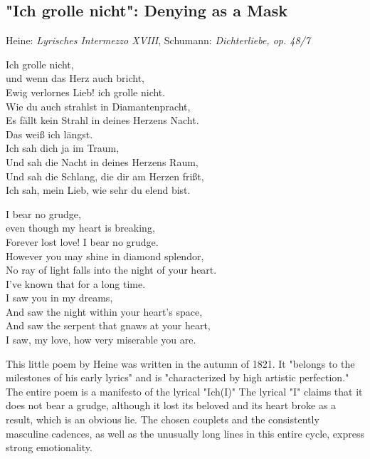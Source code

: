 \documentclass[10pt,a4paper,twocolumn]{rho}
\begin{document}
\subsection{"Ich grolle nicht": Denying as a Mask}
Heine: \textit{Lyrisches Intermezzo XVIII}, Schumann: \textit{Dichterliebe, op. 48/7}
\columnseprule=1pt 
\begin{multicols}{2}

\small {
\noindent Ich grolle nicht, \\
und wenn das Herz auch bricht,\\  
Ewig verlornes Lieb! ich grolle nicht.\\
Wie du auch strahlst in Diamantenpracht,\\
Es fällt kein Strahl in deines Herzens Nacht.\\
Das weiß ich längst.\\
Ich sah dich ja im Traum,\\
Und sah die Nacht in deines Herzens Raum,\\
Und sah die Schlang, die dir am Herzen frißt, \\ 
Ich sah, mein Lieb, wie sehr du elend bist.\\
\columnbreak

\noindent I bear no grudge, \\
even though my heart is breaking, \\ 
Forever lost love! I bear no grudge.  \\
However you may shine in diamond splendor,\\  
No ray of light falls into the night of your heart.  \\
I’ve known that for a long time.\\ 
I saw you in my dreams,\\  
And saw the night within your heart’s space,  \\
And saw the serpent that gnaws at your heart,  \\
I saw, my love, how very miserable you are.}
\end{multicols}
This little poem by Heine was written in the autumn of 1821. It "belongs to the milestones of his early lyrics" and is "characterized by high artistic perfection." The entire poem is a manifesto of the lyrical "Ich(I)" The lyrical "I" claims that it does not bear a grudge, although it lost its beloved and its heart broke as a result, which is an obvious lie. The chosen couplets and the consistently masculine cadences, as well as the unusually long lines in this entire cycle, express strong emotionality.
\end{document}

